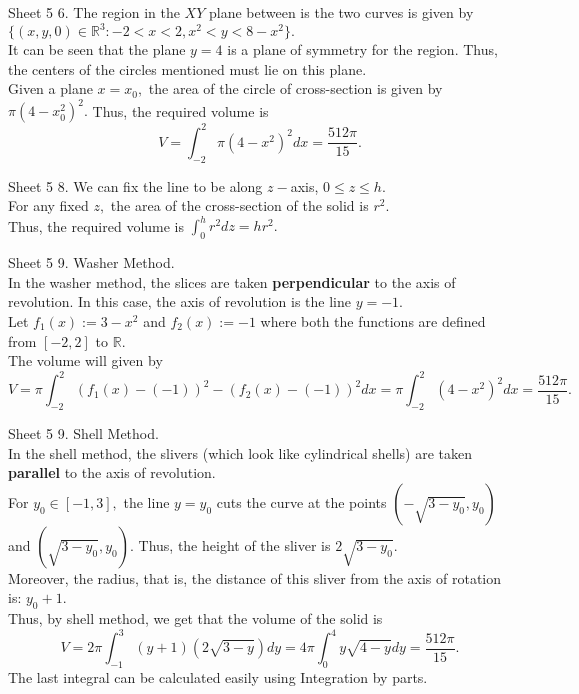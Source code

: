 \documentclass[handout, aspectratio=169]{beamer}
\begin{document}
\begin{frame}{Sheet 5}
	6. The region in the $XY$ plane between is the two curves is given by $\{(x, y, 0) \in \mathbb{R}^3 : -2 < x < 2, x^2 < y < 8 - x^2\}.$\\
	It can be seen that the plane $y = 4$ is a plane of symmetry for the region. Thus, the centers of the circles mentioned must lie on this plane.\\
	Given a plane $x = x_0,$ the area of the circle of cross-section is given by $\pi(4 - x_0^2)^2.$ Thus, the required volume is
	\[V = \int_{-2}^{2} \pi(4 - x^2)^2 dx = \frac{512\pi}{15}. \]
\end{frame}
\begin{frame}{Sheet 5}
	8. We can fix the line to be along $z-$axis, $0 \le z \le h.$\\
	For any fixed $z,$ the area of the cross-section of the solid is $r^2.$\\
	Thus, the required volume is $\displaystyle\int_{0}^{h} r^2 dz = hr^2.$
\end{frame}
\begin{frame}{Sheet 5}
	9. Washer Method. \\
	In the washer method, the slices are taken \textbf{perpendicular} to the axis of revolution. In this case, the axis of revolution is the line $y = -1.$\\
	Let $f_1(x) := 3 -x^2$ and $f_2(x) := -1$ where both the functions are defined from $[-2, 2]$ to $\mathbb{R}.$ \\
	The volume will given by
	\[V = \pi\int_{-2}^{2} (f_1(x) - (-1))^2 - (f_2(x) - (-1))^2 dx = \pi\int_{-2}^{2} (4 - x^2)^2 dx = \frac{512\pi}{15}. \]
\end{frame}
\begin{frame}{Sheet 5}
	9. Shell Method.\\
	In the shell method, the slivers (which look like cylindrical shells) are taken \textbf{parallel} to the axis of revolution.\\
	For $y_0 \in [-1, 3],$ the line $y = y_0$ cuts the curve at the points $(-\sqrt{3 - y_0}, y_0)$ and $(\sqrt{3 - y_0}, y_0).$ Thus, the height of the sliver is $2\sqrt{3 - y_0}.$\\
	Moreover, the radius, that is, the distance of this sliver from the axis of rotation is: $y_0 + 1.$\\
	Thus, by shell method, we get that the volume of the solid is
	\[V = 2\pi\int_{-1}^{3} (y+1)(2\sqrt{3 - y}) dy = 4\pi\int_{0}^{4} y\sqrt{4 - y} dy = \frac{512\pi}{15}.\]
	The last integral can be calculated easily using Integration by parts.
\end{frame}
\end{document}
